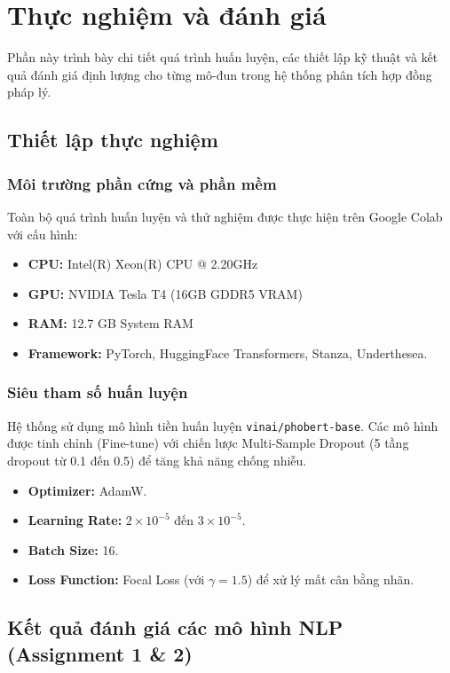 \section{Thực nghiệm và đánh giá}

Phần này trình bày chi tiết quá trình huấn luyện, các thiết lập kỹ thuật và kết quả đánh giá định lượng cho từng mô-đun trong hệ thống phân tích hợp đồng pháp lý.

\subsection{Thiết lập thực nghiệm}

\subsubsection{Môi trường phần cứng và phần mềm}
Toàn bộ quá trình huấn luyện và thử nghiệm được thực hiện trên Google Colab với cấu hình:
\begin{itemize}
    \item \textbf{CPU:} Intel(R) Xeon(R) CPU @ 2.20GHz
    \item \textbf{GPU:} NVIDIA Tesla T4 (16GB GDDR5 VRAM)
    \item \textbf{RAM:} 12.7 GB System RAM
    \item \textbf{Framework:} PyTorch, HuggingFace Transformers, Stanza, Underthesea.
\end{itemize}

\subsubsection{Siêu tham số huấn luyện}
Hệ thống sử dụng mô hình tiền huấn luyện \texttt{vinai/phobert-base}. Các mô hình được tinh chỉnh (Fine-tune) với chiến lược Multi-Sample Dropout (5 tầng dropout từ 0.1 đến 0.5) để tăng khả năng chống nhiễu.
\begin{itemize}
    \item \textbf{Optimizer:} AdamW.
    \item \textbf{Learning Rate:} $2 \times 10^{-5}$ đến $3 \times 10^{-5}$.
    \item \textbf{Batch Size:} 16.
    \item \textbf{Loss Function:} Focal Loss (với $\gamma=1.5$) để xử lý mất cân bằng nhãn.
\end{itemize}

\subsection{Kết quả đánh giá các mô hình NLP (Assignment 1 \& 2)}


